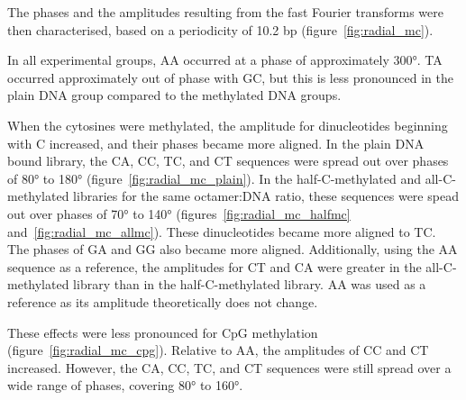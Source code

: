 \documentclass[parskip=full, numbers=noenddot]{scrbook}
\begin{document}
The phases and the amplitudes resulting from the fast Fourier transforms were then characterised, based on a periodicity of 10.2 bp (figure~\ref{fig:radial_mc}).

In all experimental groups, AA occurred at a phase of approximately \ang{300}.  TA occurred approximately out of phase with GC, but this is less pronounced in the plain DNA group compared to the methylated DNA groups.

When the cytosines were methylated, the amplitude for dinucleotides beginning with C increased, and their phases became more aligned.  In the plain DNA bound library, the CA, CC, TC, and CT sequences were spread out over phases of \ang{80} to \ang{180} (figure~\ref{fig:radial_mc_plain}).  In the half-C-methylated and all-C-methylated libraries for the same octamer:DNA ratio, these sequences were spead out over phases of \ang{70} to \ang{140} (figures~\ref{fig:radial_mc_halfmc} and~\ref{fig:radial_mc_allmc}).  These dinucleotides became more aligned to TC.  The phases of GA and GG also became more aligned.  Additionally, using the AA sequence as a reference, the amplitudes for CT and CA were greater in the all-C-methylated library than in the half-C-methylated library.  AA was used as a reference as its amplitude theoretically does not change. %

These effects were less pronounced for CpG methylation (figure~\ref{fig:radial_mc_cpg}).  Relative to AA, the amplitudes of CC and CT increased.  However, the CA, CC, TC, and CT sequences were still spread over a wide range of phases, covering \ang{80} to \ang{160}.
\end{document}
